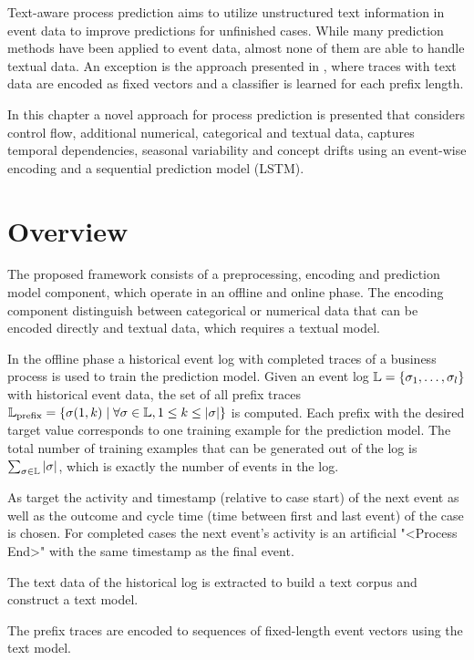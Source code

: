 Text-aware process prediction aims to utilize unstructured text information in event data to improve predictions for unfinished cases.
While many prediction methods have been applied to event data, almost none of them are able to handle textual data.
An exception is the approach presented in \cite{DBLP:conf/bpm/TeinemaaDMF16}, where traces with text data are encoded as fixed vectors and a classifier is learned for each prefix length.

In this chapter a novel approach for process prediction is presented that considers control flow, additional numerical, categorical and textual data, captures temporal dependencies, seasonal variability and concept drifts using an event-wise encoding and a sequential prediction model (LSTM).

\section{Overview}

The proposed framework consists of a preprocessing, encoding and prediction model component, which operate in an offline and online phase.
The encoding component distinguish between categorical or numerical data that can be encoded directly and textual data, which requires a textual model.

In the offline phase a historical event log with completed traces of a business process is used to train the prediction model.
Given an event log $\mathbb{L} = \{\sigma_1, \dots, \sigma_l\}$ with historical event data, the set of all prefix traces $\mathbb{L}_\mathrm{prefix} = \{\sigma(1,k) \mid \forall \sigma \in \mathbb{L}, 1 \leq k \leq |\sigma|\}$ is computed.
Each prefix with the desired target value corresponds to one training example for the prediction model.
The total number of training examples that can be generated out of the log is $\sum_{\sigma \in \mathbb{L}}|\sigma|$, which is exactly the number of events in the log.

As target the activity and timestamp (relative to case start) of the next event as well as the outcome and cycle time (time between first and last event) of the case is chosen.
For completed cases the next event's activity is an artificial "<Process End>" with the same timestamp as the final event.

The text data of the historical log is extracted to build a text corpus and construct a text model.

The prefix traces are encoded to sequences of fixed-length event vectors using the text model.




